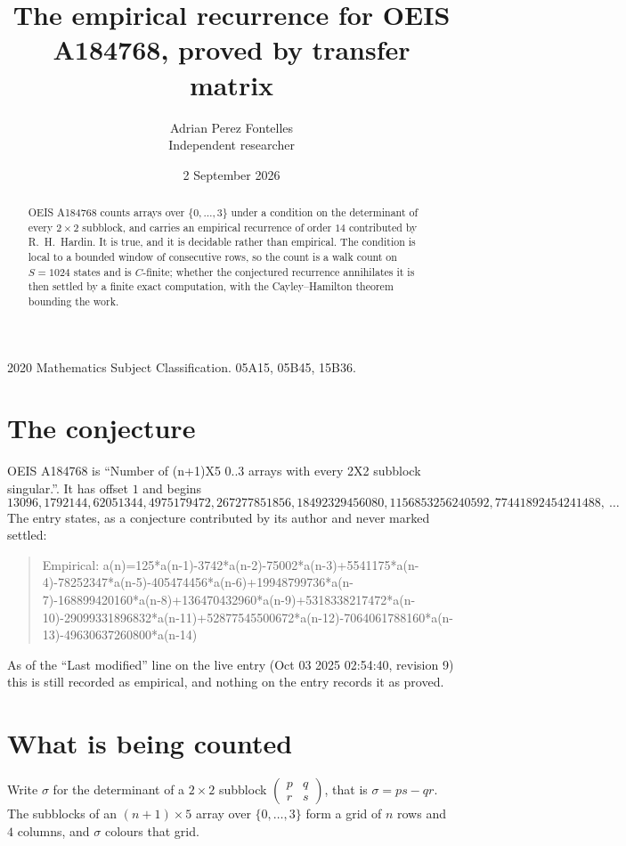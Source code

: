 \documentclass[11pt,a4paper]{article}
\title{The empirical recurrence for OEIS A184768, proved by transfer matrix}
\author{Adrian Perez Fontelles\\ \small Independent researcher}
\date{2 September 2026}
\theoremstyle{plain}
\theoremstyle{definition}
\begin{document}
\maketitle

\begin{abstract}
OEIS A184768 counts arrays over $\{0,\dots,3\}$ under a condition on the determinant of every
$2\times2$ subblock, and carries an empirical recurrence of order $14$ contributed by
R.~H.~Hardin. It is true, and it is decidable rather than empirical. The condition is local to
a bounded window of consecutive rows, so the count is a walk count on $S=1024$ states and is
$C$-finite; whether the conjectured recurrence annihilates it is then settled by a finite exact
computation, with the Cayley--Hamilton theorem bounding the work.
\end{abstract}

\noindent\small 2020 Mathematics Subject Classification. 05A15, 05B45, 15B36.\normalsize

\section{The conjecture}

OEIS A184768 is ``Number of (n+1)X5 0..3 arrays with every 2X2 subblock singular.''. It has offset $1$ and begins
\[
13096, 1792144, 62051344, 4975179472, 267277851856, 18492329456080, 1156853256240592, 77441892454241488,\ \dots
\]
The entry states, as a conjecture contributed by its author and never marked settled:
\begin{quote}
Empirical: a(n)=125*a(n-1)-3742*a(n-2)-75002*a(n-3)+5541175*a(n-4)-78252347*a(n-5)-405474456*a(n-6)+19948799736*a(n-7)-168899420160*a(n-8)+136470432960*a(n-9)+5318338217472*a(n-10)-29099331896832*a(n-11)+52877545500672*a(n-12)-7064061788160*a(n-13)-49630637260800*a(n-14)
\end{quote}
As of the ``Last modified'' line on the live entry (Oct 03 2025 02:54:40, revision 9) this is still
recorded as empirical, and nothing on the entry records it as proved.

\section{What is being counted}

Write $\sigma$ for the determinant of a $2\times2$ subblock
$\begin{pmatrix}p&q\\r&s\end{pmatrix}$, that is $\sigma=ps-qr$. The subblocks of an
$(n+1)\times5$ array over $\{0,\dots,3\}$ form a grid of $n$ rows and $4$
columns, and $\sigma$ colours that grid.
\end{document}
